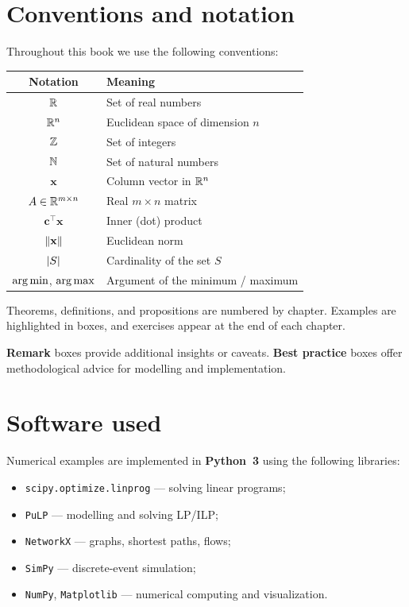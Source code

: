 \section*{Conventions and notation}

Throughout this book we use the following conventions:

\begin{center}
\renewcommand{\arraystretch}{1.3}
\begin{tabular}{cl}
  \toprule
  \textbf{Notation} & \textbf{Meaning} \\
  \midrule
  $\mathbb{R}$            & Set of real numbers \\
  $\mathbb{R}^n$          & Euclidean space of dimension $n$ \\
  $\mathbb{Z}$            & Set of integers \\
  $\mathbb{N}$            & Set of natural numbers \\
  $\mathbf{x}$    & Column vector in $\mathbb{R}^n$ \\
  $A \in \mathbb{R}^{m \times n}$ & Real $m \times n$ matrix \\
  $\mathbf{c}^\top \mathbf{x}$ & Inner (dot) product \\
  $\left\| \mathbf{x} \right\|$ & Euclidean norm \\
  $\left| S \right|$       & Cardinality of the set $S$ \\
  $\operatorname*{arg\,min}$, $\operatorname*{arg\,max}$ & Argument of the minimum / maximum \\
  \bottomrule
\end{tabular}
\end{center}

Theorems, definitions, and propositions are numbered by chapter.  Examples are
highlighted in boxes, and exercises appear at the end of each chapter.

\begin{remark}
\textbf{Remark} boxes provide additional insights or caveats.
\textbf{Best practice} boxes offer methodological advice for modelling and
implementation.
\end{remark}

\section*{Software used}

Numerical examples are implemented in \textbf{Python~3} using the following
libraries:

\begin{itemize}
  \item \texttt{scipy.optimize.linprog} --- solving linear programs;
  \item \texttt{PuLP} --- modelling and solving LP/ILP;
  \item \texttt{NetworkX} --- graphs, shortest paths, flows;
  \item \texttt{SimPy} --- discrete-event simulation;
  \item \texttt{NumPy}, \texttt{Matplotlib} --- numerical computing and
        visualization.
\end{itemize}


